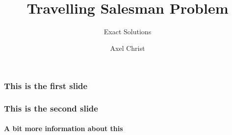 \documentclass{beamer}
\title[TSP]
{Travelling Salesman Problem}
\subtitle{Exact Solutions}
\author
{Axel Christ}
\institute{DHBW Karlsruhe}
\begin{document}
  \frame{\titlepage}
  \begin{frame}
    \frametitle{This is the first slide}
  \end{frame}
  \begin{frame}
    \frametitle{This is the second slide}
    \framesubtitle{A bit more information about this}
  \end{frame}
\end{document}

